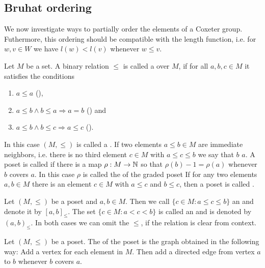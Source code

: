 \subsection{Bruhat ordering}
\label{sec:coxeter-groups-bruhat-ordering}

We now investigate ways to partially order the elements of a Coxeter group. Futhermore, this ordering should be compatible with the length function, i.e. for $w,v \in W$ we have $l(w) < l(v)$ whenever $w \leq v$.

\begin{defi}
	Let $M$ be a set. A binary relation $\leq$ is called a  over $M$, if for all $a,b,c \in M$ it satisfies the conditions
	\begin{enumerate}
		\item $a \leq a$ (),
		\item $a \leq b \wedge b \leq a \Rightarrow a=b$ () and
		\item $a \leq b \wedge b \leq c \Rightarrow a \leq c$ ().
	\end{enumerate}
	In this case $(M,\leq)$ is called a . If two elements $a \leq b \in M$ are immediate neighbors, i.e. there is no third element $c \in M$ with $a \leq c \leq b$ we say that $b$  $a$. A poset is called  if there is a map $\rho : M \to \mathbb{N}$ so that $\rho(b) - 1 = \rho(a)$ whenever $b$ covers $a$. In this case $\rho$ is called the  of the graded poset If for any two elements $a,b \in M$ there is an element $c \in M$ with $a \leq c$ and $b \leq c$, then a poset is called .
\end{defi}

\begin{defi}
	Let $(M,\leq)$ be a poset and $a,b \in M$. Then we call $\{ c \in M : a \leq c \leq b \}$ an  and denote it by $[a,b]_\leq$. The set $\{ c \in M : a < c < b \}$ is called an  and is denoted by $(a,b)_\leq$. In both cases we can omit the $\leq$, if the relation is clear from context.
\end{defi}

\begin{defi}
	Let $(M,\leq)$ be a poset. The  of the poset is the graph obtained in the following way: Add a vertex for each element in $M$. Then add a directed edge from vertex $a$ to $b$ whenever $b$ covers $a$.
\end{defi}

